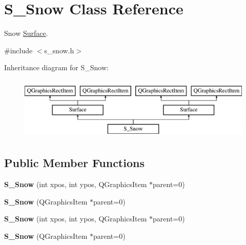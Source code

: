 \hypertarget{class_s___snow}{}\section{S\+\_\+\+Snow Class Reference}
\label{class_s___snow}


Snow \hyperlink{class_surface}{Surface}.  




{\ttfamily \#include $<$s\+\_\+snow.\+h$>$}

Inheritance diagram for S\+\_\+\+Snow\+:\begin{figure}[H]
\begin{center}
\leavevmode
\includegraphics[height=3.000000cm]{class_s___snow}
\end{center}
\end{figure}
\subsection*{Public Member Functions}
\begin{DoxyCompactItemize}
\item 
\hypertarget{class_s___snow_a58b5eb7552b3082d105e9968acc7a9fb}{}{\bfseries S\+\_\+\+Snow} (int xpos, int ypos, Q\+Graphics\+Item $\ast$parent=0)\label{class_s___snow_a58b5eb7552b3082d105e9968acc7a9fb}

\item 
\hypertarget{class_s___snow_a19a17d0be19ecb0f85b1feff5aab697f}{}{\bfseries S\+\_\+\+Snow} (Q\+Graphics\+Item $\ast$parent=0)\label{class_s___snow_a19a17d0be19ecb0f85b1feff5aab697f}

\item 
\hypertarget{class_s___snow_a58b5eb7552b3082d105e9968acc7a9fb}{}{\bfseries S\+\_\+\+Snow} (int xpos, int ypos, Q\+Graphics\+Item $\ast$parent=0)\label{class_s___snow_a58b5eb7552b3082d105e9968acc7a9fb}

\item 
\hypertarget{class_s___snow_a19a17d0be19ecb0f85b1feff5aab697f}{}{\bfseries S\+\_\+\+Snow} (Q\+Graphics\+Item $\ast$parent=0)\label{class_s___snow_a19a17d0be19ecb0f85b1feff5aab697f}

\end{DoxyCompactItemize}


